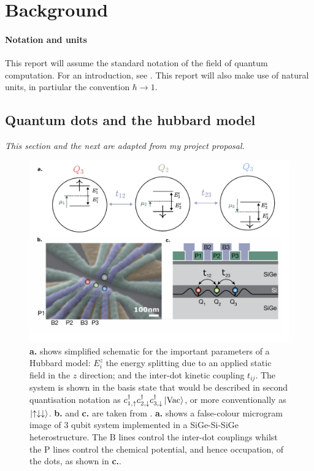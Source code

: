 \documentclass{report}
\begin{document}
\chapter{Background}\label{chapter:background}
\subsubsection{Notation and units}
This report will assume the standard notation of the field of quantum computation. For an introduction, see \cite{Nielsen2010}. This report will also make use of natural units, in partiular the convention $\hbar \rightarrow 1$.


\section{Quantum dots and the hubbard model}\label{sec:hubbard_model}
\textit{This section and the next are adapted from my project proposal.}
\begin{figure}[ht]
    \centering
    \includegraphics[scale = 0.7]{Figures/3qubithubbard.pdf}
    \caption{\textbf{a.} shows simplified schematic for the important parameters of a Hubbard model: $E_i^z$ the energy splitting due to an applied static field in the $z$ direction; and the inter-dot kinetic coupling $t_{ij}$. The system is shown in the basis state that would be described in second quantisation notation as $c_{1,\uparrow}^\dagger c_{2,\downarrow}^\dagger c_{3,\downarrow}^\dagger\ket{\text{Vac}}$, or more conventionally as $\ket{\uparrow\downarrow\downarrow}$. \textbf{b.} and \textbf{c.} are taken from \cite{Takeda2022}. \textbf{a.} shows a false-colour microgram image of 3 qubit system implemented in a SiGe-Si-SiGe heterostructure. The B lines control the inter-dot couplings whilst the P lines control the chemical potential, and hence occupation, of the dots, as shown in \textbf{c.}.}
    \label{fig:3qubitdiagram}
\end{figure}
\end{document}
